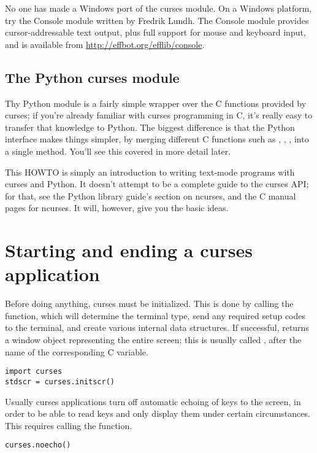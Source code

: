 \documentclass{howto}
\begin{document}
No one has made a Windows port of the curses module.  On a Windows
platform, try the Console module written by Fredrik Lundh.  The
Console module provides cursor-addressable text output, plus full
support for mouse and keyboard input, and is available from
\url{http://effbot.org/efflib/console}.

\subsection{The Python curses module}

Thy Python module is a fairly simple wrapper over the C functions
provided by curses; if you're already familiar with curses programming
in C, it's really easy to transfer that knowledge to Python.  The
biggest difference is that the Python interface makes things simpler,
by merging different C functions such as ,
, , into a single
 method.  You'll see this covered in more detail
later.

This HOWTO is simply an introduction to writing text-mode programs
with curses and Python. It doesn't attempt to be a complete guide to
the curses API; for that, see the Python library guide's section on
ncurses, and the C manual pages for ncurses.  It will, however, give
you the basic ideas.

\section{Starting and ending a curses application}

Before doing anything, curses must be initialized.  This is done by
calling the  function, which will determine the
terminal type, send any required setup codes to the terminal, and
create various internal data structures.  If successful,
 returns a window object representing the entire
screen; this is usually called , after the name of the
corresponding C
variable.

\begin{verbatim}
import curses
stdscr = curses.initscr()
\end{verbatim}

Usually curses applications turn off automatic echoing of keys to the
screen, in order to be able to read keys and only display them under
certain circumstances.  This requires calling the 
function.

\begin{verbatim}
curses.noecho()
\end{verbatim}
\end{document}

